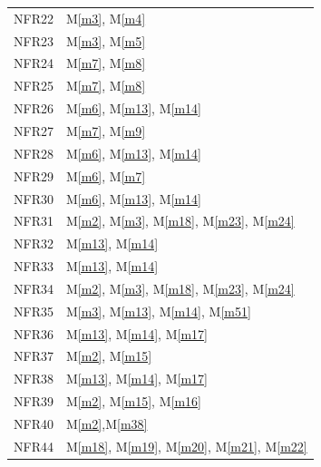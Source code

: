\documentclass[12pt, titlepage]{article}
\newcommand{\mref}[1]{M\ref{#1}}
\begin{document}
\begin{longtable}{p{} p{}}
		NFR22 & \mref{m3}, \mref{m4} \\
		NFR23 & \mref{m3}, \mref{m5} \\
		\hline 
		\newpage
		\hline
		NFR24 & \mref{m7}, \mref{m8} \\
		NFR25 & \mref{m7}, \mref{m8} \\
		NFR26 & \mref{m6}, \mref{m13}, \mref{m14}\\
		NFR27 & \mref{m7}, \mref{m9}\\
		NFR28 & \mref{m6}, \mref{m13}, \mref{m14}\\
		NFR29 & \mref{m6}, \mref{m7}\\
		NFR30 & \mref{m6}, \mref{m13}, \mref{m14}\\
		NFR31 & \mref{m2}, \mref{m3}, \mref{m18}, \mref{m23}, \mref{m24} \\
		NFR32 & \mref{m13}, \mref{m14}\\
		NFR33 & \mref{m13}, \mref{m14}\\
		NFR34 & \mref{m2}, \mref{m3}, \mref{m18}, \mref{m23}, \mref{m24} \\
		NFR35 & \mref{m3}, \mref{m13}, \mref{m14}, \mref{m51} \\
		NFR36 & \mref{m13}, \mref{m14}, \mref{m17} \\
		NFR37 & \mref{m2}, \mref{m15} \\
		NFR38 & \mref{m13}, \mref{m14},  \mref{m17} \\
		NFR39 & \mref{m2}, \mref{m15}, \mref{m16} \\
		NFR40 & \mref{m2},\mref{m38} \\
		NFR44 & \mref{m18}, \mref{m19}, \mref{m20}, \mref{m21}, \mref{m22} \\
		\bottomrule
	\end{longtable}
\newpage
\end{document}

